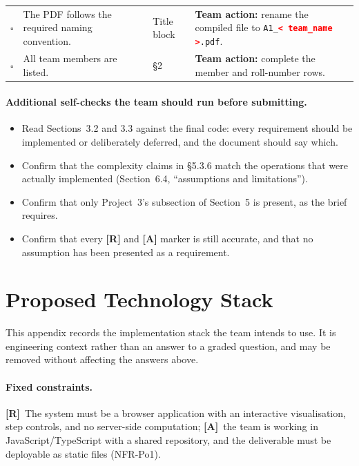 \documentclass[11pt,a4paper]{article}
\newcommand{\R}{\textcolor{reqc}{\textbf{[R]}}}     %
\newcommand{\A}{\textcolor{asmc}{\textbf{[A]}}}     %
\newcommand{\ct}[1]{\texttt{#1}}
\newcommand{\fillme}[1]{\textcolor{red}{\textbf{<\,#1\,>}}}
\begin{document}
{\begin{longtable}{@{}C{0.7cm}L{6.6cm}L{2.6cm}L{5.2cm}@{}}
$\square$ & The PDF follows the required naming convention. &
Title block & \textbf{Team action:} rename the compiled file to
\ct{A1\_\fillme{team\_name}.pdf}. \\

$\square$ & All team members are listed. &
\S2 & \textbf{Team action:} complete the member and roll-number rows. \\
\end{longtable}
}

\paragraph{Additional self-checks the team should run before submitting.}
\begin{itemize}[leftmargin=1.6em,itemsep=2pt]
  \item Read Sections~3.2 and 3.3 against the final code: every requirement should be
        implemented or deliberately deferred, and the document should say which.
  \item Confirm that the complexity claims in \S5.3.6 match the operations that were
        actually implemented (Section~6.4, ``assumptions and limitations'').
  \item Confirm that only Project~3's subsection of Section~5 is present, as the brief
        requires.
  \item Confirm that every \R{} and \A{} marker is still accurate, and that no assumption has
        been presented as a requirement.
\end{itemize}

\appendix
\section{Proposed Technology Stack}

This appendix records the implementation stack the team intends to use. It is engineering
context rather than an answer to a graded question, and may be removed without affecting the
answers above.

\paragraph{Fixed constraints.} \R\ The system must be a browser application with an
interactive visualisation, step controls, and no server-side computation; \A\ the team is
working in JavaScript/TypeScript with a shared repository, and the deliverable must be
deployable as static files (NFR-Po1).
\end{document}
